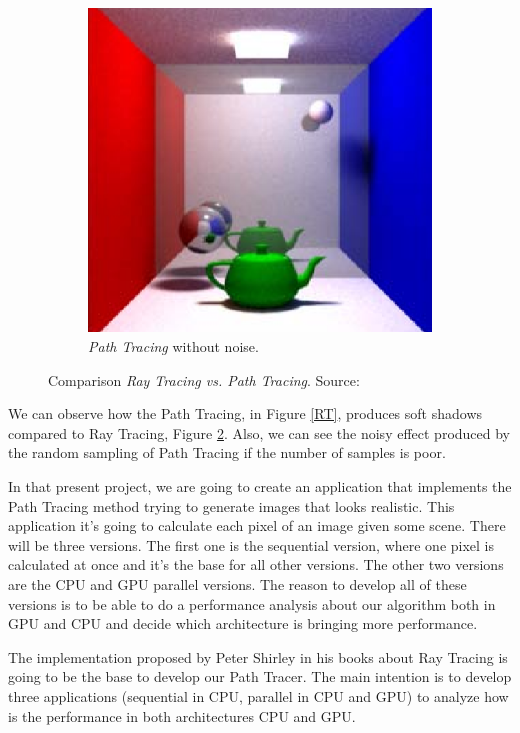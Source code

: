 \documentclass[titlepage,12pt]{article}
\begin{document}
\begin{figure}[H]
\begin{subfigure}{.3\textwidth}
		\includegraphics[width=.8\textwidth]{media/PathTracingMD.png}	
		\caption{\textit{Path Tracing} without noise.}
		\label{PT}
	\end{subfigure}
	\caption{Comparison \textit{Ray Tracing vs. Path Tracing}. Source: \citep{Cassagnabere2004}}
\end{figure}

We can observe how the Path Tracing, in Figure \ref{RT}, produces soft shadows compared to Ray Tracing, Figure \ref{PT}. Also, we can see the noisy effect produced by the random sampling of Path Tracing if the number of samples is poor.

In that present project, we are going to create an application that implements the Path Tracing method trying to generate images that looks realistic. This application it's going to calculate each pixel of an image given some scene. There will be three versions. The first one is the sequential version, where one pixel is calculated at once and it's the base for all other versions. The other two versions are the CPU and GPU parallel versions. The reason to develop all of these versions is to be able to do a performance analysis about our algorithm both in GPU and CPU and decide which architecture is bringing more performance.

The implementation proposed by Peter Shirley in his books about Ray Tracing  \citep{ShirleyRTA, ShirleyRTB, ShirleyRTC} is going to be the base to develop our Path Tracer. The main intention is to develop three applications (sequential in CPU, parallel in CPU and GPU) to analyze how is the performance in both architectures CPU and GPU.
\end{document}
